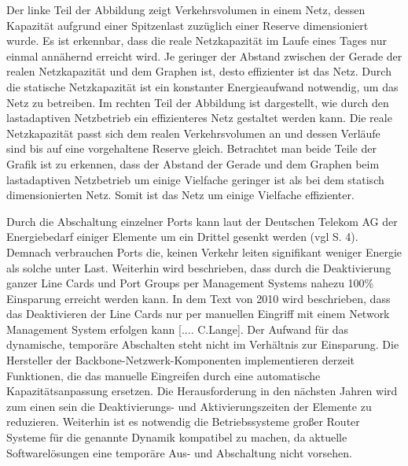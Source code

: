 Der linke Teil der Abbildung zeigt Verkehrsvolumen in einem Netz, dessen Kapazität aufgrund einer Spitzenlast zuzüglich einer Reserve dimensioniert wurde. Es ist erkennbar, dass die reale Netzkapazität im Laufe eines Tages nur einmal annähernd erreicht wird. Je geringer der Abstand zwischen der Gerade der realen Netzkapazität und dem Graphen ist, desto effizienter ist das Netz. Durch die statische Netzkapazität ist ein konstanter Energieaufwand notwendig, um das Netz zu betreiben. Im rechten Teil der Abbildung ist dargestellt, wie durch den lastadaptiven Netzbetrieb ein effizienteres Netz gestaltet werden kann. Die reale Netzkapazität passt sich dem realen Verkehrsvolumen an und dessen Verläufe sind bis auf eine vorgehaltene Reserve gleich. Betrachtet man beide Teile der Grafik ist zu erkennen, dass der Abstand der Gerade und dem Graphen beim lastadaptiven Netzbetrieb um einige Vielfache geringer ist als bei dem statisch dimensionierten Netz. Somit ist das Netz um einige Vielfache effizienter.

Durch die Abschaltung einzelner Ports kann laut der Deutschen Telekom AG der Energiebedarf einiger Elemente um ein Drittel gesenkt werden (vgl \cite{lange} S. 4). Demnach verbrauchen Ports die, keinen Verkehr leiten signifikant weniger Energie als solche unter Last. Weiterhin wird beschrieben, dass durch die Deaktivierung ganzer Line Cards und Port Groups per Management Systems nahezu 100\% Einsparung erreicht werden kann. In dem Text von 2010 wird beschrieben, dass das Deaktivieren der Line Cards nur per manuellen Eingriff mit einem Network Management System erfolgen kann [.... C.Lange]. Der Aufwand für das dynamische, temporäre Abschalten steht nicht im Verhältnis zur Einsparung. Die Hersteller der Backbone-Netzwerk-Komponenten implementieren derzeit Funktionen, die das manuelle Eingreifen durch eine automatische Kapazitätsanpassung ersetzen. Die Herausforderung in den nächsten Jahren wird zum einen sein die Deaktivierungs- und Aktivierungszeiten der Elemente zu reduzieren. Weiterhin ist es notwendig die Betriebssysteme großer Router Systeme für die genannte Dynamik kompatibel zu machen, da aktuelle Softwarelösungen eine temporäre Aus- und Abschaltung nicht vorsehen.

